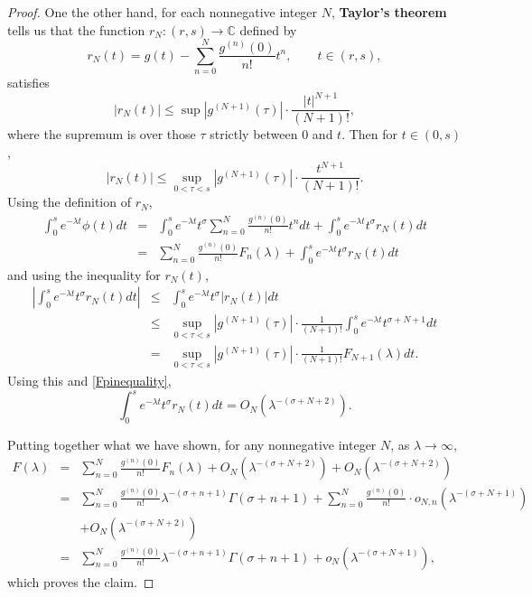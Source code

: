 \documentclass{article}
\theoremstyle{definition}
\begin{document}
\begin{proof}
One the other hand, for each nonnegative integer $N$, \textbf{Taylor's theorem} tells us  that the function $r_N:(r,s) \to \mathbb{C}$ defined 
by
\[
r_N(t) = g(t) - \sum_{n=0}^N \frac{g^{(n)}(0)}{n!}t^n, \qquad t \in (r,s),
\]
satisfies
\[
|r_N(t)| \leq \sup |g^{(N+1)}(\tau)| \cdot \frac{|t|^{N+1}}{(N+1)!},
\]
where the supremum is over those $\tau$ strictly between $0$ and $t$.  
Then for $t \in (0,s)$,
\[
|r_N(t)| \leq \sup_{0 < \tau <s } |g^{(N+1)}(\tau)| \cdot \frac{t^{N+1}}{(N+1)!}.
\]
Using the definition of $r_N$,
\begin{eqnarray*}
 \int_0^s e^{-\lambda t} \phi(t) dt &=& \int_0^s e^{-\lambda t} t^\sigma  \sum_{n=0}^N \frac{g^{(n)}(0)}{n!}t^n dt
+\int_0^s e^{-\lambda t} t^\sigma r_N(t) dt\\
&=& \sum_{n=0}^N \frac{g^{(n)}(0)}{n!}
F_n(\lambda)
+\int_0^s e^{-\lambda t} t^\sigma r_N(t) dt
\end{eqnarray*}
and using the inequality for $r_N(t)$,
\begin{eqnarray*}
\left| \int_0^s e^{-\lambda t} t^\sigma r_N(t) dt \right| & \leq & \int_0^s e^{-\lambda t} t^\sigma |r_N(t)| dt\\
&\leq& \sup_{0 < \tau < s} |g^{(N+1)}(\tau)| \cdot \frac{1}{(N+1)!} \int_0^s e^{-\lambda t} t^{\sigma+N+1} dt\\
&=& \sup_{0 < \tau < s} |g^{(N+1)}(\tau)| \cdot \frac{1}{(N+1)!} F_{N+1}(\lambda) dt.
\end{eqnarray*}
Using this and \eqref{Fpinequality}, 
\[
\int_0^s e^{-\lambda t} t^\sigma r_N(t) dt = O_N ( \lambda^{-(\sigma+N+2)}).
\]

Putting together what we have shown,  for any nonnegative integer $N$, as $\lambda \to \infty$,
\begin{eqnarray*}
F(\lambda)&=& \sum_{n=0}^N \frac{g^{(n)}(0)}{n!}
F_n(\lambda)
+O_N ( \lambda^{-(\sigma+N+2)})
+O_N(\lambda^{-(\sigma+N+2)})\\
&=& \sum_{n=0}^N \frac{g^{(n)}(0)}{n!}
\lambda^{-(\sigma+n+1)}  \Gamma(\sigma+n+1)
+\sum_{n=0}^N 
 \frac{g^{(n)}(0)}{n!}
\cdot o_{N,n}(\lambda^{-(\sigma+N+1)})\\
&&+O_N(\lambda^{-(\sigma+N+2)})\\
&=& \sum_{n=0}^N \frac{g^{(n)}(0)}{n!}
\lambda^{-(\sigma+n+1)}  \Gamma(\sigma+n+1) + o_N(\lambda^{-(\sigma+N+1)}),
\end{eqnarray*}
which proves the claim.
\end{proof}
\end{document}
